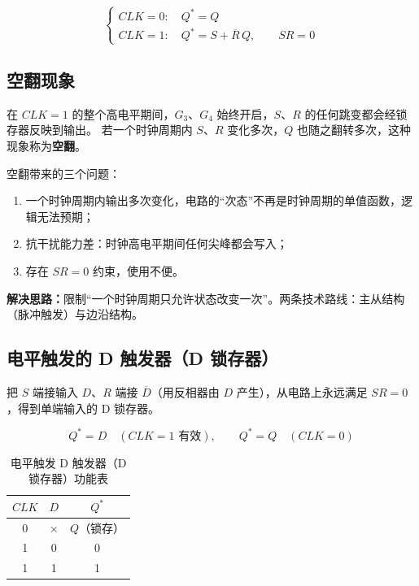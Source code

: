\begin{equation}
\begin{cases}
CLK=0:\quad Q^* = Q\\[2pt]
CLK=1:\quad Q^* = S + \overline{R}\,Q,\qquad SR = 0
\end{cases}
\label{eq:sync_sr}
\end{equation}

\subsection{空翻现象}
在 $CLK=1$ 的整个高电平期间，$G_3$、$G_4$ 始终开启，$S$、$R$ 的任何跳变都会经锁存器反映到输出。
若一个时钟周期内 $S$、$R$ 变化多次，$Q$ 也随之翻转多次，这种现象称为\textbf{空翻}。

\noindent 空翻带来的三个问题：
\begin{enumerate}
    \item 一个时钟周期内输出多次变化，电路的“次态”不再是时钟周期的单值函数，逻辑无法预期；
    \item 抗干扰能力差：时钟高电平期间任何尖峰都会写入；
    \item 存在 $SR=0$ 约束，使用不便。
\end{enumerate}

\noindent\textbf{解决思路：}限制“一个时钟周期只允许状态改变一次”。两条技术路线：主从结构（脉冲触发）与边沿结构。

\subsection{电平触发的 D 触发器（D 锁存器）}
把 $S$ 端接输入 $D$、$R$ 端接 $\overline{D}$（用反相器由 $D$ 产生），从电路上永远满足 $SR=0$，得到单端输入的 D 锁存器。

\begin{equation}
Q^* = D \quad (CLK=1 \text{ 有效}),\qquad Q^*=Q \quad (CLK=0)
\label{eq:d_latch}
\end{equation}

\begin{table}[!htbp]
\centering
\caption{电平触发 D 触发器（D 锁存器）功能表}
\begin{tabular}{cc|c}
\toprule
$CLK$ & $D$ & $Q^*$ \\
\midrule
0 & $\times$ & $Q$（锁存） \\
1 & 0 & 0 \\
1 & 1 & 1 \\
\bottomrule
\end{tabular}
\end{table}

